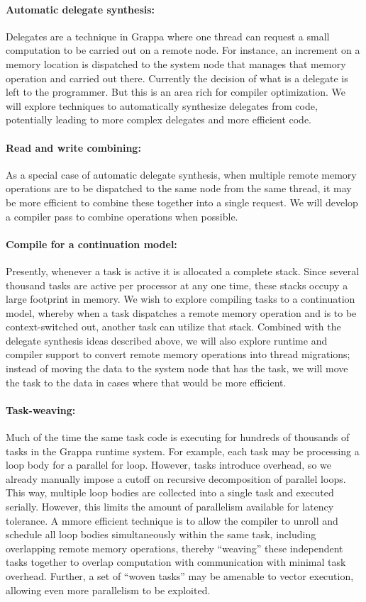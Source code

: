 \paragraph{Automatic delegate synthesis: } Delegates are a technique in Grappa where one thread can request a small computation to be carried out on a remote node.  For instance, an increment on a memory location is dispatched to the system node that manages that memory operation and carried out there.  Currently the decision of what is a delegate is left to the programmer.  But this is an area rich for compiler optimization.  We will explore techniques to automatically synthesize delegates from code, potentially leading to more complex delegates and more efficient code.

\paragraph{Read and write combining: } As a special case of automatic delegate synthesis, when multiple remote memory operations are to be dispatched to the same node from the same thread, it may be more efficient to combine these together into a single request.  We will develop a compiler pass to combine operations when possible.

\paragraph{Compile for a continuation model: } Presently, whenever a task is active it is allocated a complete stack.  Since several thousand tasks are active per processor at any one time, these stacks occupy a large footprint in memory.  We wish to explore compiling tasks to a continuation model, whereby when a task dispatches a remote memory operation and is to be context-switched out, another task can utilize that stack.  Combined with the delegate synthesis ideas described above, we will also explore runtime and compiler support to convert remote memory operations into thread migrations; instead of moving the data to the system node that has the task, we will move the task to the data in cases where that would be more efficient.

\paragraph{Task-weaving: } Much of the time the same task code is executing for hundreds of thousands of tasks in the Grappa runtime system.  For example, each task may be processing a loop body for a parallel for loop.  However, tasks introduce overhead, so we already manually impose a cutoff on recursive decomposition of parallel loops.  This way, multiple loop bodies are collected into a single task and executed serially.  However, this limits the amount of parallelism available for latency tolerance. A mmore efficient technique is to allow the compiler to unroll and schedule all loop bodies simultaneously within the same task, including overlapping remote memory operations, thereby ``weaving'' these independent tasks together to overlap computation with communication with minimal task overhead.  Further, a set of ``woven tasks'' may be amenable to vector execution, allowing even more parallelism to be exploited.

